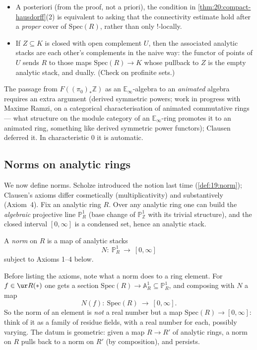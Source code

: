 \begin{remark}
\label{rmk:20:two-remarks}
\leavevmode
\begin{itemize}
\item A posteriori (from the proof, not a priori), the condition in
\cref{thm:20:compact-hausdorff}(2) is equivalent to asking that the connectivity
estimate hold after a \emph{proper} cover of $\mathrm{Spec}(R)$, rather than only
$!$-locally.
\item If $Z\subseteq K$ is closed with open complement $U$, then the associated
analytic stacks are each other's complements in the naive way: the functor of
points of $U$ sends $R$ to those maps $\mathrm{Spec}(R)\to K$ whose pullback to
$Z$ is the empty analytic stack, and dually. (Check on profinite sets.)
\end{itemize}
The passage from $F((\pi_0)_*\mathbb Z)$ as an $\mathbb E_\infty$-algebra to an
\emph{animated} algebra requires an extra argument (derived symmetric powers;
work in progress with Maxime Ramzi, on a categorical characterisation of animated
commutative rings --- what structure on the module category of an $\mathbb
E_\infty$-ring promotes it to an animated ring, something like derived symmetric
power functors); Clausen deferred it. In characteristic $0$ it is automatic.
\end{remark}

\subsection{Norms on analytic rings}
\label{subsec:20:norms}

We now define norms. Scholze introduced the notion last time
(\cref{def:19:norm}); Clausen's axioms differ cosmetically (multiplicativity) and
substantively (Axiom~4). Fix an analytic ring $R$. Over any analytic ring one can
build the \emph{algebraic} projective line $\mathbb P^1_R$ (base change of
$\mathbb P^1_{\mathbb Z}$ with its trivial structure), and the closed interval
$[0,\infty]$ is a condensed set, hence an analytic stack.

\begin{definition}[Norm]
\label{def:20:norm}
A \emph{norm} on $R$ is a map of analytic stacks
\begin{equation*}
N\colon\ \mathbb P^1_R\ \longrightarrow\ [0,\infty]
\end{equation*}
subject to Axioms 1--4 below.
\end{definition}

Before listing the axioms, note what a norm does to a ring element. For $f\in
\ur R(\ast)$ one gets a section $\mathrm{Spec}(R)\to\mathbb A^1_R\subseteq
\mathbb P^1_R$, and composing with $N$ a map
\begin{equation*}
N(f)\colon\ \mathrm{Spec}(R)\ \longrightarrow\ [0,\infty].
\end{equation*}
So the norm of an element is \emph{not} a real number but a map
$\mathrm{Spec}(R)\to[0,\infty]$: think of it as a family of residue fields, with
a real number for each, possibly varying. The datum is geometric: given a map
$R\to R'$ of analytic rings, a norm on $R$ pulls back to a norm on $R'$ (by
composition), and persists.

